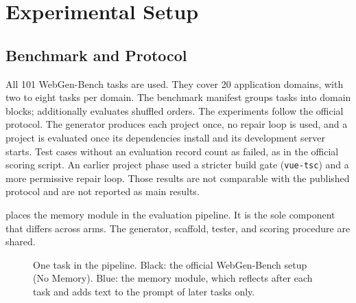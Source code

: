\chapter{Experimental Setup}
\label{chap:setup}

\section{Benchmark and Protocol}
All 101 WebGen-Bench tasks are used. They cover 20 application domains, with two to eight tasks per domain. The benchmark manifest groups tasks into domain blocks;  additionally evaluates shuffled orders. The experiments follow the official protocol. The generator produces each project once, no repair loop is used, and a project is evaluated once its dependencies install and its development server starts. Test cases without an evaluation record count as failed, as in the official scoring script. An earlier project phase used a stricter build gate (\texttt{vue-tsc}) and a more permissive repair loop. Those results are not comparable with the published protocol and are not reported as main results.

 places the memory module in the evaluation pipeline. It is the sole component that differs across arms. The generator, scaffold, tester, and scoring procedure are shared.

\begin{figure}[ht]
\centering
{}
\caption{One task in the pipeline. Black: the official WebGen-Bench setup (No Memory). Blue: the memory module, which reflects after each task and adds text to the prompt of later tasks only.}
\label{fig:pipeline}
\end{figure}

